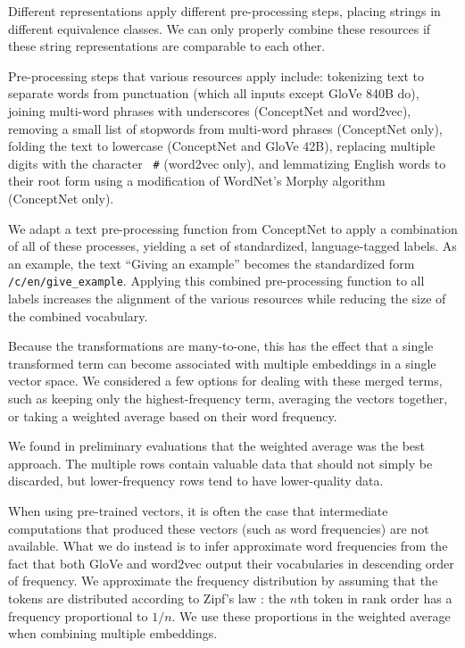 \documentclass[11pt,letterpaper]{article}
\begin{document}
Different representations apply
different pre-processing steps, placing strings in different equivalence
classes. We can only properly combine these resources if these string
representations are comparable to each other.

Pre-processing steps that various resources apply include: tokenizing text to
separate words from punctuation (which all inputs except GloVe 840B do),
joining multi-word phrases with underscores (ConceptNet and word2vec), removing
a small list of stopwords from multi-word phrases (ConceptNet only), folding the text to lowercase
(ConceptNet and GloVe 42B), replacing multiple digits with the character {\tt
\#} (word2vec only), and lemmatizing English words to their root form using a
modification of WordNet's Morphy algorithm (ConceptNet only).

We adapt a text pre-processing function from ConceptNet to apply a combination
of all of these processes, yielding a set of standardized, language-tagged
labels. As an example, the text ``Giving an example'' becomes the standardized
form {\tt /c/en/give\_example}. Applying this combined pre-processing function
to all labels increases the alignment of the various resources while reducing
the size of the combined vocabulary.

Because the transformations are many-to-one, this has the effect that a single
transformed term can become associated with multiple embeddings in a single
vector space. We considered a few options for dealing with these merged terms,
such as keeping only the highest-frequency term, averaging the vectors together,
or taking a weighted average based on their word frequency.

We found in preliminary evaluations that the weighted average was the best
approach. The multiple rows contain valuable data that should not simply be
discarded, but lower-frequency rows tend to have lower-quality data.

When using pre-trained vectors, it is often the case that intermediate
computations that produced these vectors (such as word frequencies) are not
available. What we do instead is to infer approximate word frequencies from
the fact that both GloVe and word2vec output their vocabularies in descending
order of frequency. We approximate the frequency distribution by assuming that
the tokens are distributed according to Zipf's law \cite{zipf1949human}: the
$n$th token in rank order has a frequency proportional to $1/n$. We use these
proportions in the weighted average when combining multiple embeddings.
\end{document}
